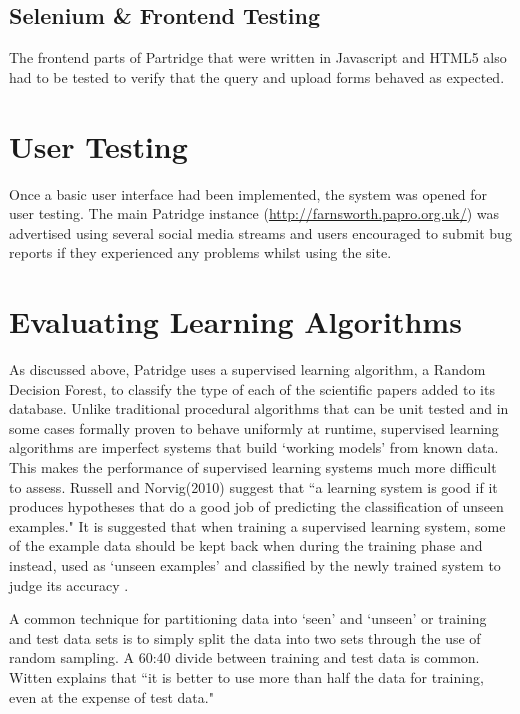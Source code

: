 \subsection{ Selenium \& Frontend Testing }

The frontend parts of Partridge that were written in Javascript and HTML5 also
had to be tested to verify that the query and upload forms behaved as expected.


\section{ User Testing } 

Once a basic user interface had been implemented, the system was opened for
user testing. The main Patridge instance
(\url{http://farnsworth.papro.org.uk/}) was advertised using several social
media streams and users encouraged to submit bug reports if they experienced
any problems whilst using the site.


\section{ Evaluating Learning Algorithms }

As discussed above, Patridge uses a supervised learning algorithm, a Random
Decision Forest, to classify the type of each of the scientific papers added to
its database. Unlike traditional procedural algorithms that can be unit tested
and in some cases formally proven to behave uniformly at
runtime\cite{filliatre2007formal}, supervised learning algorithms are imperfect
systems that build `working models' from known data. This makes the performance
of supervised learning systems much more difficult to assess. Russell and
Norvig(2010) suggest that ``a learning system is good if it produces hypotheses
that do a good job of predicting the classification of unseen
examples\cite{russell2010artificial}." It is suggested that when training a
supervised learning system, some of the example data should be kept back when
during the training phase and instead, used as `unseen examples' and classified
by the newly trained system to judge its accuracy
\cite{alpaydin2004introduction}\cite{russell2010artificial}.

A common technique for partitioning data into `seen' and `unseen' or training
and test data sets is to simply split the data into two sets through the use of
random sampling.  A 60:40 divide between training and test data is common.
Witten explains that ``it is better to use more than half the data for
training, even at the expense of test data\cite{witten2005data}." 

